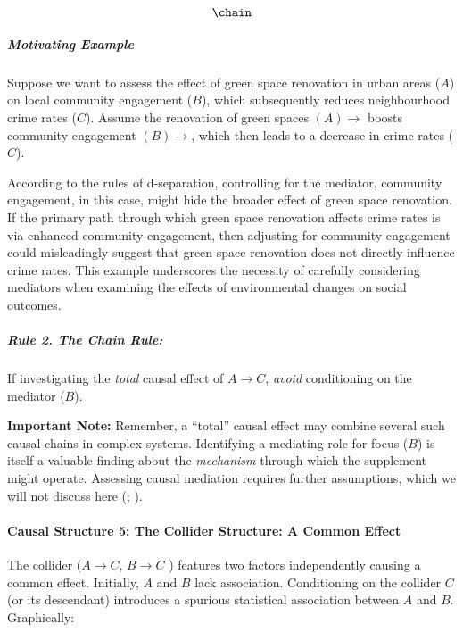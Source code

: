 \documentclass[
  singlecolumn]{article}
\let\oldparagraph\paragraph
\renewcommand{\paragraph}[1]{\oldparagraph{#1}\mbox{}}
\let\oldsubparagraph\subparagraph
\renewcommand{\subparagraph}[1]{\oldsubparagraph{#1}\mbox{}}
\begin{document}
\[\chain\]

\subparagraph{Motivating Example}\label{motivating-example-1}

Suppose we want to assess the effect of green space renovation in urban
areas (\(A\)) on local community engagement (\(B\)), which subsequently
reduces neighbourhood crime rates (\(C\)). Assume the renovation of
green spaces \((A) \rightarrow\) boosts community engagement
\((B) \rightarrow\), which then leads to a decrease in crime rates
(\(C\)).

According to the rules of d-separation, controlling for the mediator,
community engagement, in this case, might hide the broader effect of
green space renovation. If the primary path through which green space
renovation affects crime rates is via enhanced community engagement,
then adjusting for community engagement could misleadingly suggest that
green space renovation does not directly influence crime rates. This
example underscores the necessity of carefully considering mediators
when examining the effects of environmental changes on social outcomes.

\subparagraph{\texorpdfstring{\textbf{Rule 2. The Chain
Rule:}}{Rule 2. The Chain Rule:}}\label{rule-2.-the-chain-rule}

If investigating the \emph{total} causal effect of \(A\to C\),
\emph{avoid} conditioning on the mediator (\(B\)).

\textbf{Important Note:} Remember, a ``total'' causal effect may combine
several such causal chains in complex systems. Identifying a mediating
role for focus (\(B\)) is itself a valuable finding about the
\emph{mechanism} through which the supplement might operate. Assessing
causal mediation requires further assumptions, which we will not discuss
here (;
).

\paragraph{Causal Structure 5: The Collider Structure: A Common
Effect}\label{causal-structure-5-the-collider-structure-a-common-effect}

The collider (\(A\to C\), \(B \to C\) ) features two factors
independently causing a common effect. Initially, \(A\) and \(B\) lack
association. Conditioning on the collider \(C\) (or its descendant)
introduces a spurious statistical association between \(A\) and \(B\).
Graphically:
\end{document}
